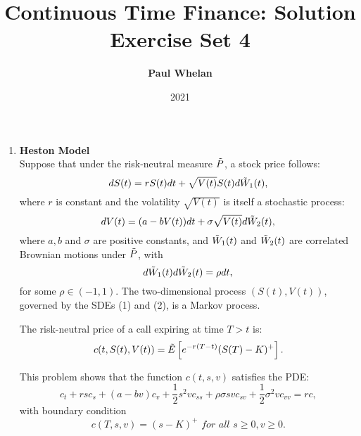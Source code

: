 \documentclass[handout,8pt]{beamer}
\title{Continuous Time Finance: Solution Exercise Set 4}
\author{\textbf{Paul Whelan}}
\institute{Copenhagen Business School}
\date{2021}
\begin{document}
\begin{frame}
     \titlepage
\end{frame}






\begin{frame}[allowframebreaks]{ }



\begin{enumerate}
    \item \textbf{Heston Model} \\
    Suppose that under the risk-neutral measure $\Tilde{P}$, a stock price follows:
    \begin{equation}
        dS(t) = rS(t) dt + \sqrt{V(t)} S(t) d\Tilde{W}_1(t),
    \end{equation}
    where $r$ is constant and the volatility $\sqrt{V(t)}$ is itself a stochastic process:
    \begin{equation}
        dV(t) = (a - bV(t)) dt + \sigma \sqrt{V(t)} d\Tilde{W}_2(t),
    \end{equation}
    where $a,b$ and $\sigma$ are positive constants, and $\Tilde{W}_1(t)$ and $\Tilde{W}_2(t)$ are correlated Brownian motions under $\Tilde{P}$, with
    \begin{equation*}
        d\Tilde{W}_1(t) d\Tilde{W}_2(t) = \rho dt,
    \end{equation*}
    for some $\rho\in(-1,1)$. The two-dimensional process $(S(t), V(t))$, governed by the SDEs (1) and (2), is a Markov process.\newline
    
    \newpage
    
    The risk-neutral price of a call expiring at time $T>t$ is:
    \begin{equation*}
        c(t,S(t), V(t)) = \Tilde{E}\left[e^{-r(T-t)}(S(T)-K)^+\right].
    \end{equation*}
    
    This problem shows that the function $c(t,s,v)$ satisfies the PDE:
    \begin{equation}
        c_t + rsc_s + (a-bv)c_v + \frac{1}{2}s^2 vc_{ss} + \rho \sigma svc_{sv} + \frac{1}{2}\sigma^2 vc_{vv} = rc,
    \end{equation}
    with boundary condition
    \begin{equation}
        c(T,s,v) = (s-K)^+ \textit{ for all } s\geq 0, v\geq 0. 
    \end{equation}
    

\end{enumerate}
\end{frame}
\end{document}
